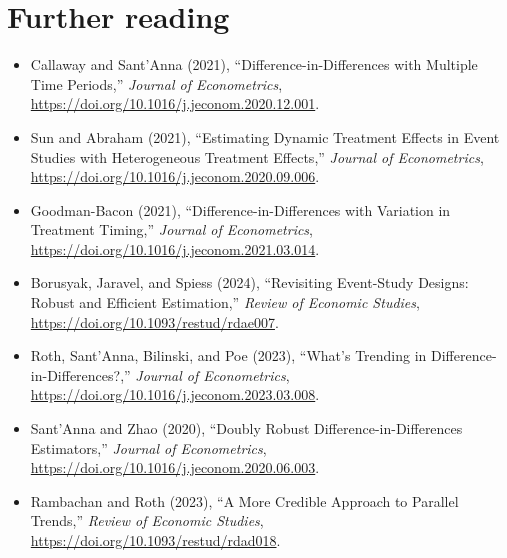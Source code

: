 \section*{Further reading}

\begin{itemize}
  \raggedright
  \item Callaway and Sant'Anna (2021), ``Difference-in-Differences with Multiple
  Time Periods,'' \emph{Journal of Econometrics},
  \url{https://doi.org/10.1016/j.jeconom.2020.12.001}.
  \item Sun and Abraham (2021), ``Estimating Dynamic Treatment Effects in Event
  Studies with Heterogeneous Treatment Effects,'' \emph{Journal of
  Econometrics}, \url{https://doi.org/10.1016/j.jeconom.2020.09.006}.
  \item Goodman-Bacon (2021), ``Difference-in-Differences with Variation in
  Treatment Timing,'' \emph{Journal of Econometrics},
  \url{https://doi.org/10.1016/j.jeconom.2021.03.014}.
  \item Borusyak, Jaravel, and Spiess (2024), ``Revisiting Event-Study Designs:
  Robust and Efficient Estimation,'' \emph{Review of Economic Studies},
  \url{https://doi.org/10.1093/restud/rdae007}.
  \item Roth, Sant'Anna, Bilinski, and Poe (2023), ``What's Trending in
  Difference-in-Differences?,'' \emph{Journal of Econometrics},
  \url{https://doi.org/10.1016/j.jeconom.2023.03.008}.
  \item Sant'Anna and Zhao (2020), ``Doubly Robust Difference-in-Differences
  Estimators,'' \emph{Journal of Econometrics},
  \url{https://doi.org/10.1016/j.jeconom.2020.06.003}.
  \item Rambachan and Roth (2023), ``A More Credible Approach to Parallel
  Trends,'' \emph{Review of Economic Studies},
  \url{https://doi.org/10.1093/restud/rdad018}.
\end{itemize}
